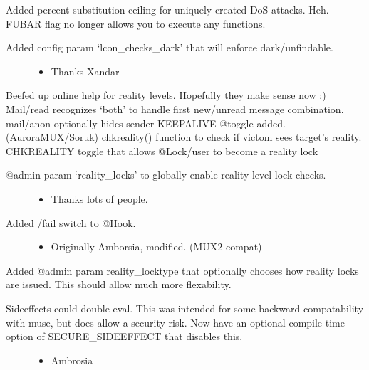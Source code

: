 \documentclass[letterpaper,10pt,english]{sphinxmanual}
\begin{document}
\sphinxAtStartPar
Added percent substitution ceiling for uniquely created DoS attacks.  Heh.
FUBAR flag no longer allows you to execute any functions.
\begin{description}
\item[{Added config param ‘lcon\_checks\_dark’ that will enforce dark/unfindable.}] \leavevmode\begin{itemize}
\item {} 
\sphinxAtStartPar
Thanks Xandar

\end{itemize}

\end{description}

\sphinxAtStartPar
Beefed up on\sphinxhyphen{}line help for reality levels.  Hopefully they make sense now :)
Mail/read recognizes ‘both’ to handle first new/unread message combination.
mail/anon optionally hides sender
KEEPALIVE @toggle added. \sphinxhyphen{} (AuroraMUX/Soruk)
chkreality() function to check if victom sees target’s reality.
CHKREALITY toggle that allows @Lock/user to become a reality lock
\begin{description}
\item[{@admin param ‘reality\_locks’ to globally enable reality level lock checks.}] \leavevmode\begin{itemize}
\item {} 
\sphinxAtStartPar
Thanks lots of people.

\end{itemize}

\item[{Added /fail switch to @Hook.}] \leavevmode\begin{itemize}
\item {} 
\sphinxAtStartPar
Originally Amborsia, modified. (MUX2 compat)

\end{itemize}

\end{description}

\sphinxAtStartPar
Added @admin param reality\_locktype that optionally chooses how reality locks are issued.  This should allow much more flexability.
\begin{description}
\item[{Sideeffects could double eval.  This was intended for some backward compatability with muse, but does allow a security risk.  Now have an optional compile time option of SECURE\_SIDEEFFECT that disables this.}] \leavevmode\begin{itemize}
\item {} 
\sphinxAtStartPar
Ambrosia

\end{itemize}

\end{description}
\end{document}

